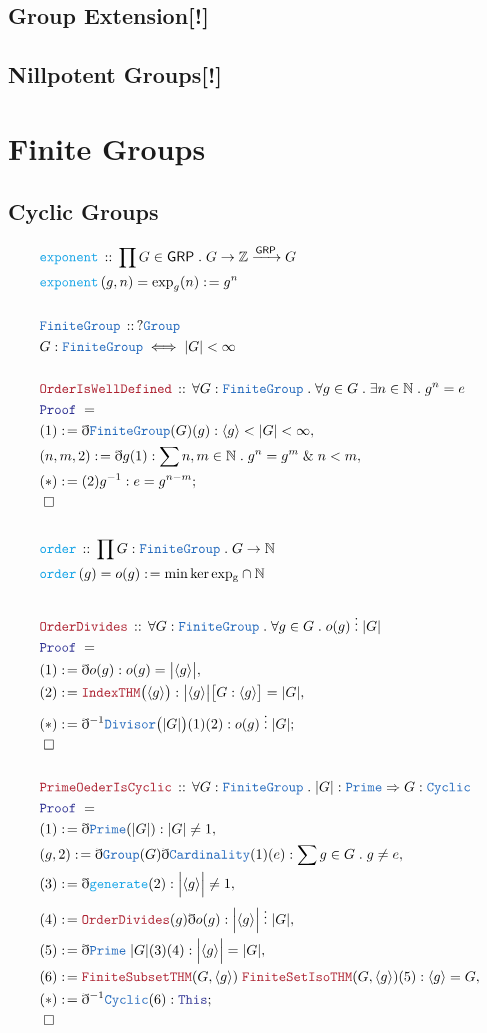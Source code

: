 \documentclass[12pt]{scrartcl}
\newcommand{\TYPE}[1]{\textcolor{NavyBlue}{\mathtt{#1}}}
\newcommand{\FUNC}[1]{\textcolor{Cerulean}{\mathtt{#1}}}
\newcommand{\LOGIC}[1]{\textcolor{Blue}{\mathtt{#1}}}
\newcommand{\THM}[1]{\textcolor{Maroon}{\mathtt{#1}}}
\renewcommand{\.}{\; . \;}
\newcommand{\de}{: \kern 0.1pc =}
\newcommand{\Act}[1]{\left( #1 \right)}
\newcommand{\Theorem}[2]{& \THM{#1} \, :: \, #2 \\ & \Proof = \\ }
\newcommand{\DeclareType}[2]{& \TYPE{#1} \, :: \, #2 \\}
\newcommand{\DefineType}[3]{& #1 : \TYPE{#2} \iff #3 \\}
\newcommand{\DeclareFunc}[2]{& \FUNC{#1} \, :: \, #2 \\}
\newcommand{\DefineNamedFunc}[4]{&  \FUNC{#1}\Act{#2} = #3 \de #4 \\}
\newcommand{\Page}[1]{ \begin{align*} #1 \end{align*}   }
\newcommand{ \bd }{ \ByDef }
\renewcommand{\And}{\; \& \;}
\newcommand{\Int}{\mathbb{Z} }
\newcommand{\Nat}{\mathbb{N} }
\newcommand{\Say}[3]{& #1 \de #2 : #3, \\}
\newcommand{\Conclude}[3]{& #1 \de #2 : #3; \\}
\newcommand{\QED}{\; \square}
\newcommand{\EndProof}{& \QED \\}
\newcommand{\ByDef}{\eth}
\newcommand{\Proof}{\LOGIC{Proof} \; }
\newcommand{\FG}{\TYPE{FiniteGroup}}
\newcommand{\GRP}{\mathsf{GRP}}
\begin{document}
\subsection{Group Extension[!]}
\subsection{Nillpotent Groups[!]}
\newpage
\section{Finite Groups}
\subsection{Cyclic Groups}
\Page{
	\DeclareFunc{exponent}{ \prod G \in \GRP \. G \to \Int \xrightarrow{\GRP} G  }
 \DefineNamedFunc{exponent}{g,n}{\mathrm{exp}_g(n)}{g^n}
 \\
 \DeclareType{FiniteGroup}{ ? \TYPE{Group}}
 \DefineType{G}{FiniteGroup}{ |G| < \infty }
 \\
 \Theorem{OrderIsWellDefined}{\forall G : \FG \. \forall g \in G \. \exists n \in \Nat \. g^n = e}
 \Say{(1)}{\bd \FG(G)(g)}{ \langle g \rangle < |G| < \infty }
 \Say{(n,m,2)}{ \bd g (1) }{ \sum n,m \in \Nat \. g^n = g^m \And n < m  }
 \Conclude{(*)}{(2)g^{-1}}{ e = g^{n - m}}
 \EndProof
 \\
 \DeclareFunc{order}{ \prod G : \FG \. G \to \Nat   }
 \DefineNamedFunc{order}{g}{o(g)}{ \min \ker \mathrm{exp_g} \cap \Nat}
 \\
 \Theorem{OrderDivides}{\forall G : \FG \. \forall g \in G \. o(g) \; \vdots \; |G|  }
 \Say{(1)}{\bd o(g)}{o(g) = \big|\langle g \rangle\big|}
 \Say{(2)}{\THM{IndexTHM}\big(\langle g \rangle\big)}{ \big| \langle g \rangle \big| \big[ G : \langle g \rangle \big] = |G|  }
 \Conclude{(*)}{\bd^{-1} \TYPE{Divisor}\big(|G|\big)(1)(2)}{ o(g) \; \vdots \; |G|   }
 \EndProof
 \\
 \Theorem{PrimeOederIsCyclic}{\forall G : \FG \. |G| : \TYPE{Prime} \Rightarrow G : \TYPE{Cyclic}}
 \Say{(1)}{\bd \TYPE{Prime}(|G|)}{|G| \neq 1}
 \Say{(g,2)}{ \bd \TYPE{Group}(G)\bd \TYPE{Cardinality}(1)(e)}{ \sum g \in G \. g \neq e }
 \Say{(3)}{\bd \FUNC{generate}(2)}{ \Big|\langle g \rangle\Big| \neq 1}
 \Say{(4)}{ \THM{OrderDivides}(g)\bd o(g)}{ \Big| \langle g \rangle \Big| \; \vdots \; |G|   }
 \Say{(5)}{\bd \TYPE{Prime} \; |G| (3)(4) }{ \Big| \langle g \rangle \Big| = |G| }
 \Say{(6)}{ \THM{FiniteSubsetTHM}(G,\langle g \rangle) \; \THM{FiniteSetIsoTHM}(G,\langle g \rangle)(5) }
 { \langle g \rangle = G  }
 \Conclude{(*)}{\bd^{-1} \TYPE{Cyclic} (6)}{ \LOGIC{This}}
 \EndProof
}
\end{document}
